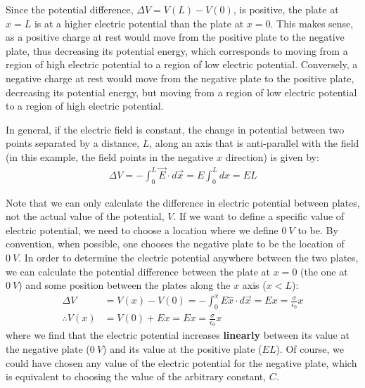 \begin{example}
Since the potential difference, $\Delta V=V(L)-V(0)$, is positive, the plate at $x=L$ is at a higher electric potential than the plate at $x=0$. This makes sense, as a positive charge at rest would move from the positive plate to the negative plate, thus decreasing its potential energy, which corresponds to moving from a region of high electric potential to a region of low electric potential. Conversely, a negative charge at rest would move from the negative plate to the positive plate, decreasing its potential energy, but moving from a region of low electric potential to a region of high electric potential. 

In general, if the electric field is constant, the change in potential between two points separated by a distance, $L$, along an axis that is anti-parallel with the field (in this example, the field points in the negative $x$ direction) is given by:
\begin{align*}
\Delta V =- \int_0^L  \vec E\cdot d\vec x=E\int_0^L dx= EL
\end{align*}

Note that we can only calculate the difference in electric potential between plates, not the actual value of the potential, $V$. If we want to define a specific value of electric potential, we need to choose a location where we define $\SI{0}{V}$ to be. By convention, when possible, one chooses the negative plate to be the location of $\SI{0}{V}$. In order to determine the electric potential anywhere between the two plates, we can calculate the potential difference between the plate at $x=0$ (the one at $\SI{0}{V}$) and some position between the plates along the $x$ axis ($x<L$):
\begin{align*}
\Delta V &=V(x)-V(0)=-\int_0^x E \hat x \cdot d\vec x= Ex =\frac{\sigma}{\epsilon_0}x\\
\therefore V(x)&=V(0)+Ex=Ex=\frac{\sigma}{\epsilon_0}x
\end{align*}
where we find that the electric potential increases \textbf{linearly} between its value at the negative plate ($\SI{0}{V}$) and its value at the positive plate ($EL$). Of course, we could have chosen any value of the electric potential for the negative plate, which is equivalent to choosing the value of the arbitrary constant, $C$.


\end{example}
